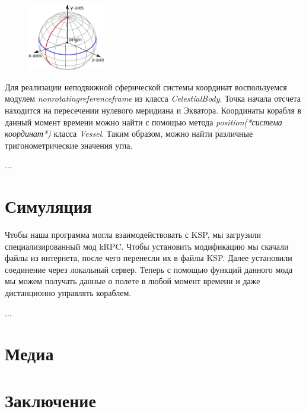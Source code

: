\begin{figure} %
	\centering
	\includegraphics[width=0.3\textwidth]{celestial-body}
\end{figure}
Для реализации неподвижной сферической системы координат воспользуемся модулем \textit{non\tus rotating\tus reference\tus frame} из класса \textit{CelestialBody}. Точка начала отсчета находится на пересечении нулевого меридиана и Экватора. Координаты корабля в данный момент времени можно найти с помощью метода \textit{position(*система координат*)} класса \textit{Vessel}. Таким образом, можно найти различные тригонометрические значения угла.

...
\section{Симуляция}
Чтобы наша программа могла взаимодействовать с KSP, мы загрузили специализированный мод kRPC. Чтобы установить модификацию мы скачали файлы из интернета, после чего перенесли их в файлы KSP. Далее установили соединение через локальный сервер. Теперь с помощью функций данного мода мы можем получать данные о полете в любой момент времени и даже дистанционно управлять кораблем.

...

\section{Медиа}

\section*{Заключение}

